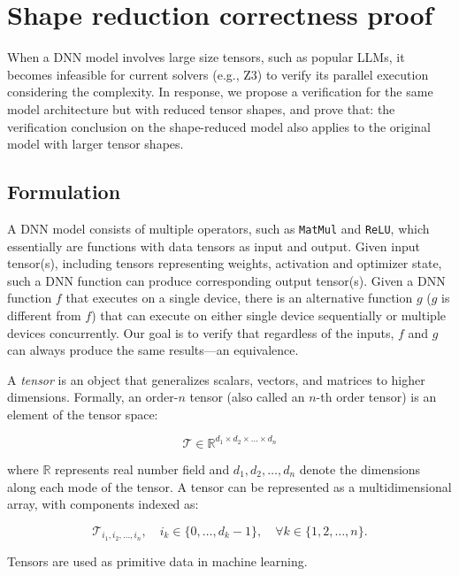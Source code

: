 \clearpage

\section{Shape reduction correctness proof}
\label{appx:sec:dim_red}

When a DNN model involves large size tensors, such as popular LLMs, it becomes
infeasible for current solvers (e.g., Z3) to verify its parallel execution
considering the complexity.
In response, we propose a verification for the same model architecture but with reduced tensor shapes, and prove that:
the verification conclusion on the shape-reduced model also applies to the original model with larger tensor shapes.

\subsection{Formulation}

A DNN model consists of multiple operators, such as \texttt{MatMul} and
\texttt{ReLU}, which essentially are functions with data tensors as input and output.
Given input tensor(s), including tensors representing weights,
activation and optimizer state, such a DNN function can produce corresponding
output tensor(s).
Given a DNN function $f$ that executes on a single device, there is an
alternative function $g$ ($g$ is different from $f$) that can execute on either
single device sequentially or multiple devices concurrently.
Our goal is to verify that
regardless of the inputs,
$f$ and $g$ can always produce the same results---an equivalence.

\begin{definition}[Tensor]
A \textit{tensor} is an object that generalizes scalars, vectors,
    and matrices to higher dimensions.
    Formally, an order-$n$ tensor (also called an $n$-th order tensor)
    is an element of the tensor space:

\begin{equation}
\mathcal{T} \in \mathbb{R}^{d_1 \times d_2 \times \dots \times d_n}
\end{equation}

where $\mathbb{R}$ represents real number field and $d_1, d_2, \dots, d_n$ denote the
    dimensions along each mode of the tensor. A tensor can be represented as a
    multidimensional array, with components indexed as:

\begin{equation}
\mathcal{T}_{i_1,i_2,\dots,i_n}, \quad i_k \in \{0, \dots, d_k-1\}, \quad \forall k \in \{1, 2, \dots, n\}.
\end{equation}

Tensors are used as primitive data in machine learning.

\end{definition}

